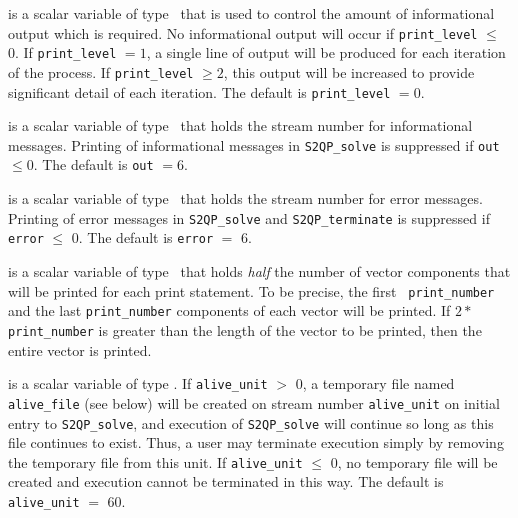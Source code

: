 \documentclass{galahad}
\newcommand{\packagename}{S2QP}
\begin{document}
\begin{description}

 is a scalar variable of type \integer\ that is used
to control the amount of informational output which is required. No 
informational output will occur if {\tt print\_level} $\leq$ 0. 
If {\tt print\_level} $= 1$, a single line of output will be produced for each
iteration of the process. If {\tt print\_level} $\geq 2$, this output will be
increased to provide significant detail of each iteration.
The default is {\tt print\_level} $= 0$. 

 is a scalar variable of type \integer\ that holds the
stream number for informational messages.
Printing of informational messages in 
{\tt \packagename\_solve}
is suppressed if {\tt out} $\leq 0$.
The default is {\tt out} $= 6$.

 is a scalar variable of type \integer\ that holds the
stream number for error messages.
Printing of error messages in 
{\tt \packagename\_solve}
and
{\tt \packagename\_terminate}
is suppressed if {\tt error} $\leq$ 0.
The default is {\tt error} $=$ 6.

 is a scalar variable of type \integer\
that holds {\em half} the number of vector components that will be
printed for each print statement.  To be precise, the first {\tt
  print\_number} and the last {\tt print\_number} components of each
vector will be printed.  If $2\ast${\tt print\_number} is greater than the
length of the vector to be printed, then the entire vector is printed.

 is a scalar variable of type \integer.
If {\tt alive\_unit} $>$ 0, a temporary file named {\tt alive\_file} (see below)
will be created on stream number {\tt alive\_unit} on initial entry to 
{\tt \packagename\_solve}, and execution of {\tt \packagename\_solve} will continue so
long as this file continues to exist. Thus, a user may terminate execution
simply by removing the temporary file from this unit.
If {\tt alive\_unit} $\leq$ 0, no temporary file will be created and
execution cannot be terminated in this way.
The default is {\tt alive\_unit} $=$ 60.




\end{description}
\end{document}
